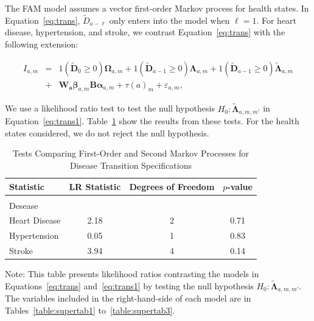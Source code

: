 \noindent The FAM model assumes a vector first-order Markov process for health states. In Equation~\eqref{eq:trans}, $\tilde{D}_{a - \ell}$ only enters into the model when $\ell = 1$. For heart disease, hypertension, and stroke, we contrast Equation~\eqref{eq:trans} with the following extension: 

\begin{eqnarray}
I_{a,m} &=& \bm{\mathit{1}} \left( \tilde{\bm{D}}_{0} \geq 0 \right) \bm{\Omega}_{a,m} + \bm{\mathit{1}} \left( \tilde{\bm{D}}_{a-1} \geq 0\right) \bm{\Lambda}_{a,m}  + \bm{\mathit{1}} \left( \tilde{\bm{D}}_{a-1} \geq 0\right) \tilde{\bm{\Lambda}}_{a,m} \nonumber \\ 
&+&  \bm{W_a} \bm{\beta}_{a,m}  \bm{B} \bm{\alpha}_{a,m} + \tau \left( a \right)_{m} + \varepsilon_{a,m}, \label{eq:trans1}
\end{eqnarray}

We use a likelihood ratio test to test the null hypothesis $H_0: \tilde{\bm{\Lambda}}_{a,m,m'}$ in Equation~\eqref{eq:trans1}. Table~\ref{table:lrtests} show the results from these tests. For the health states considered, we do not reject the null hypothesis.

\begin{table}[H]
\begin{threeparttable}
\caption{Tests Comparing First-Order and Second Markov Processes for Disease Transition Specifications} \label{table:lrtests}
\centering
\footnotesize
\begin{tabular}{lccc}
\toprule
Statistic & LR Statistic & Degrees of Freedom & $p$-value \\
\midrule \\
Desease & \\
Heart Disease & 2.18 & 2 & 0.71 \\
Hypertension   & 0.05 & 1 & 0.83 \\
Stroke              & 3.94 & 4 & 0.14 \\
\bottomrule
\end{tabular}
\begin{tablenotes}
\footnotesize
\item Note: This table presents likelihood ratios contrasting the models in Equations~\ref{eq:trans} and~\eqref{eq:trans1} by testing the null hypothesis $H_0: \tilde{\bm{\Lambda}}_{a,m,m'}$. The variables included in the right-hand-side of each model are in Tables~\ref{table:supertab1} to~\ref{table:supertab3}. 
\end{tablenotes}
\end{threeparttable}
\end{table}

